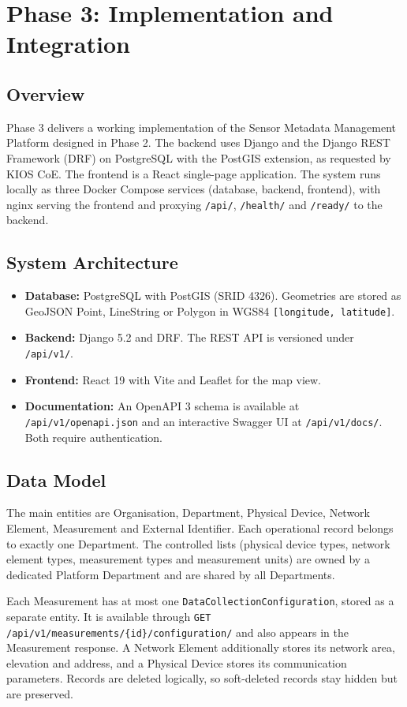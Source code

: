 \section{Phase 3: Implementation and Integration}

\subsection{Overview}
Phase 3 delivers a working implementation of the Sensor Metadata Management Platform designed in Phase 2. The backend uses Django and the Django REST Framework (DRF) on PostgreSQL with the PostGIS extension, as requested by KIOS CoE. The frontend is a React single-page application. The system runs locally as three Docker Compose services (database, backend, frontend), with nginx serving the frontend and proxying \texttt{/api/}, \texttt{/health/} and \texttt{/ready/} to the backend.

\subsection{System Architecture}
\begin{itemize}
  \item \textbf{Database:} PostgreSQL with PostGIS (SRID 4326). Geometries are stored as GeoJSON Point, LineString or Polygon in WGS84 \texttt{[longitude, latitude]}.
  \item \textbf{Backend:} Django 5.2 and DRF. The REST API is versioned under \texttt{/api/v1/}.
  \item \textbf{Frontend:} React 19 with Vite and Leaflet for the map view.
  \item \textbf{Documentation:} An OpenAPI 3 schema is available at \texttt{/api/v1/openapi.json} and an interactive Swagger UI at \texttt{/api/v1/docs/}. Both require authentication.
\end{itemize}

\subsection{Data Model}
The main entities are Organisation, Department, Physical Device, Network Element, Measurement and External Identifier. Each operational record belongs to exactly one Department. The controlled lists (physical device types, network element types, measurement types and measurement units) are owned by a dedicated Platform Department and are shared by all Departments.

Each Measurement has at most one \texttt{DataCollectionConfiguration}, stored as a separate entity. It is available through \texttt{GET /api/v1/measurements/\{id\}/configuration/} and also appears in the Measurement response. A Network Element additionally stores its network area, elevation and address, and a Physical Device stores its communication parameters. Records are deleted logically, so soft-deleted records stay hidden but are preserved.

